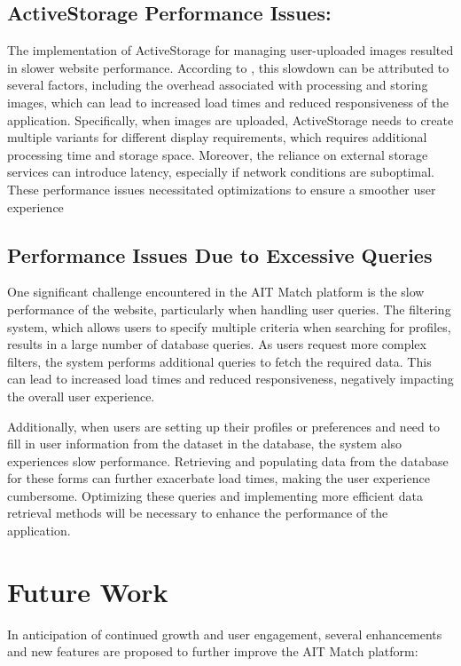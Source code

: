     \newpage
    \subsection{ActiveStorage Performance Issues:} The implementation of ActiveStorage for managing user-uploaded images resulted in slower website performance. According to \cite{rails_active_storage}, this slowdown can be attributed to several factors, including the overhead associated with processing and storing images, which can lead to increased load times and reduced responsiveness of the application. Specifically, when images are uploaded, ActiveStorage needs to create multiple variants for different display requirements, which requires additional processing time and storage space. Moreover, the reliance on external storage services can introduce latency, especially if network conditions are suboptimal. These performance issues necessitated optimizations to ensure a smoother user experience

    \subsection{Performance Issues Due to Excessive Queries}
    One significant challenge encountered in the AIT Match platform is the slow performance of the website, particularly when handling user queries. The filtering system, which allows users to specify multiple criteria when searching for profiles, results in a large number of database queries. As users request more complex filters, the system performs additional queries to fetch the required data. This can lead to increased load times and reduced responsiveness, negatively impacting the overall user experience.
    
    Additionally, when users are setting up their profiles or preferences and need to fill in user information from the dataset in the database, the system also experiences slow performance. Retrieving and populating data from the database for these forms can further exacerbate load times, making the user experience cumbersome. Optimizing these queries and implementing more efficient data retrieval methods will be necessary to enhance the performance of the application.

\newpage
\section{Future Work}
In anticipation of continued growth and user engagement, several enhancements and new features are proposed to further improve the AIT Match platform:

